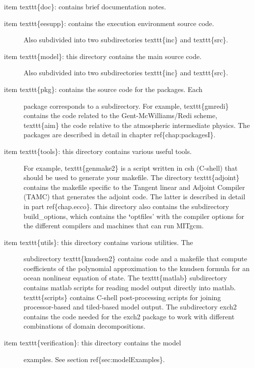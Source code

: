 \documentclass[letterpaper,10pt,english]{sphinxmanual}
\begin{document}
item texttt\{doc\}: contains brief documentation notes.
\begin{description}
\item[{item texttt\{eesupp\}: contains the execution environment source code.}] \leavevmode
Also subdivided into two subdirectories texttt\{inc\} and
texttt\{src\}.

\item[{item texttt\{model\}: this directory contains the main source code.}] \leavevmode
Also subdivided into two subdirectories texttt\{inc\} and
texttt\{src\}.

\item[{item texttt\{pkg\}: contains the source code for the packages. Each}] \leavevmode
package corresponds to a subdirectory. For example, texttt\{gmredi\}
contains the code related to the Gent-McWilliams/Redi scheme,
texttt\{aim\} the code relative to the atmospheric intermediate
physics. The packages are described in detail in chapter ref\{chap:packagesI\}.

\item[{item texttt\{tools\}: this directory contains various useful tools.}] \leavevmode
For example, texttt\{genmake2\} is a script written in csh (C-shell)
that should be used to generate your makefile. The directory
texttt\{adjoint\} contains the makefile specific to the Tangent
linear and Adjoint Compiler (TAMC) that generates the adjoint code.
The latter is described in detail in part ref\{chap.ecco\}.
This directory also contains the subdirectory build\_options, which
contains the {\color{red}\bfseries{}{}`}optfiles' with the compiler options for the different
compilers and machines that can run MITgcm.

\item[{item texttt\{utils\}: this directory contains various utilities. The}] \leavevmode
subdirectory texttt\{knudsen2\} contains code and a makefile that
compute coefficients of the polynomial approximation to the knudsen
formula for an ocean nonlinear equation of state. The
texttt\{matlab\} subdirectory contains matlab scripts for reading
model output directly into matlab. texttt\{scripts\} contains C-shell
post-processing scripts for joining processor-based and tiled-based
model output. The subdirectory exch2 contains the code needed for
the exch2 package to work with different combinations of domain
decompositions.

\item[{item texttt\{verification\}: this directory contains the model}] \leavevmode
examples. See section ref\{sec:modelExamples\}.

\end{description}
\end{document}

